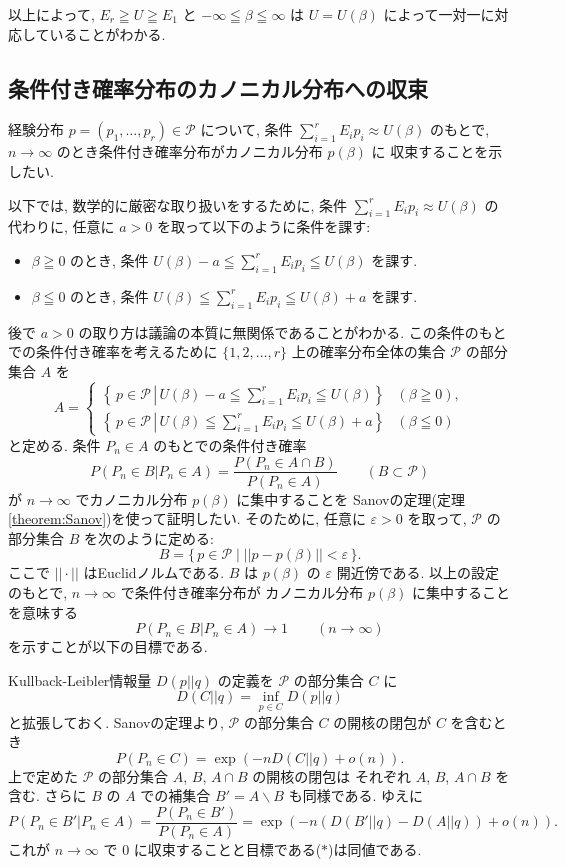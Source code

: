 \documentclass[12pt,twoside]{jarticle}
\newcommand\eps{\varepsilon}
\renewcommand\setminus{\smallsetminus}
\newcommand\cP{{\mathcal P}}
\theoremstyle{jplain}
\theoremstyle{jplain}
\theoremstyle{jplain}
\numberwithin{theorem}{section}
\numberwithin{equation}{section}
\numberwithin{figure}{section}
\numberwithin{table}{section}
\newcommand\theoremref[1]{定理\ref{#1}}
\begin{document}
以上によって, $E_r\geqq U\geqq E_1$ と $-\infty\leqq\beta\leqq\infty$
は $U=U(\beta)$ によって一対一に対応していることがわかる.


\subsection{条件付き確率分布のカノニカル分布への収束}

経験分布 $p=(p_1,\ldots,p_r)\in\cP$ について, 
条件 $\sum_{i=1}^r E_i p_i\approx U(\beta)$ のもとで,  
$n\to\infty$ のとき条件付き確率分布がカノニカル分布 $p(\beta)$ に
収束することを示したい.

以下では, 数学的に厳密な取り扱いをするために,
条件 $\sum_{i=1}^r E_i p_i\approx U(\beta)$ の代わりに,
任意に $a>0$ を取って以下のように条件を課す:
\begin{itemize}
\item $\beta\geqq 0$ のとき, 条件 \(
\displaystyle
U(\beta)-a \leqq \sum_{i=1}^r E_i p_i \leqq U(\beta)
\) を課す. 
\item $\beta\leqq 0$ のとき, 条件 \(
\displaystyle
U(\beta)\leqq \sum_{i=1}^r E_i p_i \leqq U(\beta)+a
\) を課す. 
\end{itemize}
後で $a>0$ の取り方は議論の本質に無関係であることがわかる.
この条件のもとでの条件付き確率を考えるために
$\{1,2,\ldots,r\}$ 上の確率分布全体の集合 $\cP$ の部分集合 $A$ を
\[
A =
\begin{cases}
\left\{\,p\in\cP \,\left|\, 
U(\beta)-a \leqq \sum_{i=1}^r E_i p_i \leqq U(\beta) \right.\right\} 
& (\beta\geqq 0), 
\\
\left\{\, p\in\cP \,\left|\, 
U(\beta)\leqq \sum_{i=1}^r E_i p_i \leqq U(\beta)+a \right.\right\} 
& (\beta\leqq 0)
\end{cases}
\]
と定める. 条件 $P_n\in A$ のもとでの条件付き確率
\[
P(P_n\in B|P_n\in A)=\frac{P(P_n\in A\cap B)}{P(P_n\in A)}
\qquad (B\subset\cP)
\]
が $n\to\infty$ でカノニカル分布 $p(\beta)$ に集中することを
Sanovの定理(\theoremref{theorem:Sanov})を使って証明したい. 
そのために, 任意に $\eps>0$ を取って, 
$\cP$ の部分集合 $B$ を次のように定める:
\[
B = \{\,p\in\cP \mid ||p-p(\beta)||<\eps \,\}.
\]
ここで $||\cdot||$ はEuclidノルムである.
$B$ は $p(\beta)$ の $\eps$ 開近傍である.
以上の設定のもとで, $n\to\infty$ で条件付き確率分布が
カノニカル分布 $p(\beta)$ に集中することを意味する
\[
P(P_n\in B|P_n\in A)\to 1
\qquad (n\to\infty)
\tag{$*$}
\]
を示すことが以下の目標である.

Kullback-Leibler情報量 $D(p||q)$ の定義を $\cP$ の部分集合 $C$ に
\[
D(C||q) = \inf_{p\in C}D(p||q)
\]
と拡張しておく. 
Sanovの定理より, $\cP$ の部分集合 $C$ の開核の閉包が $C$ を含むとき 
\[
P(P_n\in C) = \exp(-n D(C||q) + o(n)).
\]
上で定めた $\cP$ の部分集合 $A$, $B$, $A\cap B$ の開核の閉包は
それぞれ $A$, $B$, $A\cap B$ を含む. 
さらに $B$ の $A$ での補集合 $B'=A\setminus B$ も同様である.
ゆえに
\[
P(P_n\in B'|P_n\in A)
=\frac{P(P_n\in B')}{P(P_n\in A)}
=\exp(-n(D(B'||q)-D(A||q))+o(n)).
\]
これが $n\to\infty$ で $0$ に収束することと目標である($*$)は同値である.
\end{document}
